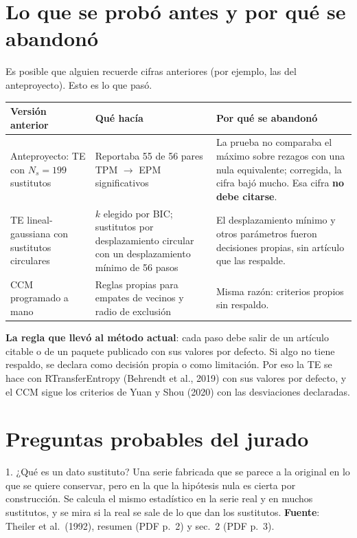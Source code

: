 \documentclass[11pt,openany]{book}
\begin{document}
\chapter{Lo que se probó antes y por qué se abandonó}\label{cap:descartado}

Es posible que alguien recuerde cifras anteriores (por ejemplo, las del anteproyecto). Esto es lo que pasó.

\begin{center}\small
\begin{tabular}{>{\raggedright}p{4cm}>{\raggedright}p{4.6cm}>{\raggedright\arraybackslash}p{5.4cm}}
\toprule
Versión anterior & Qué hacía & Por qué se abandonó \\
\midrule
Anteproyecto: TE con $N_s = 199$ sustitutos & Reportaba 55 de 56 pares TPM $\to$ EPM significativos & La prueba no comparaba el máximo sobre rezagos con una nula equivalente; corregida, la cifra bajó mucho. Esa cifra \textbf{no debe citarse}. \\
\addlinespace
TE lineal-gaussiana con sustitutos circulares & $k$ elegido por BIC; sustitutos por desplazamiento circular con un desplazamiento mínimo de 56 pasos & El desplazamiento mínimo y otros parámetros fueron decisiones propias, sin artículo que las respalde. \\
\addlinespace
CCM programado a mano & Reglas propias para empates de vecinos y radio de exclusión & Misma razón: criterios propios sin respaldo. \\
\bottomrule
\end{tabular}
\end{center}

\textbf{La regla que llevó al método actual}: cada paso debe salir de un artículo citable o de un paquete publicado con sus valores por defecto. Si algo no tiene respaldo, se declara como decisión propia o como limitación. Por eso la TE se hace con RTransferEntropy (Behrendt et al., 2019) con sus valores por defecto, y el CCM sigue los criterios de Yuan y Shou (2020) con las desviaciones declaradas.

\chapter{Preguntas probables del jurado}\label{cap:preguntas}

\begin{respuesta}{1. ¿Qué es un dato sustituto?}
Una serie fabricada que se parece a la original en lo que se quiere conservar, pero en la que la hipótesis nula es cierta por construcción. Se calcula el mismo estadístico en la serie real y en muchos sustitutos, y se mira si la real se sale de lo que dan los sustitutos. \textbf{Fuente}: Theiler et al.\ (1992), resumen (PDF p.~2) y sec.~2 (PDF p.~3).
\end{respuesta}
\end{document}
